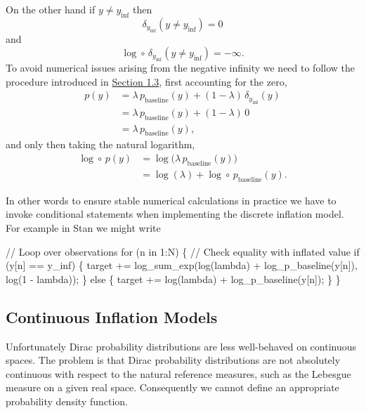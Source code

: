 \documentclass[
  letterpaper,
  DIV=11,
  numbers=noendperiod]{scrartcl}
\newenvironment{Shaded}{\begin{snugshade}}{\end{snugshade}}
\newcommand{\CommentTok}[1]{\textcolor[rgb]{0.37,0.37,0.37}{#1}}
\newcommand{\ControlFlowTok}[1]{\textcolor[rgb]{0.00,0.23,0.31}{#1}}
\newcommand{\DecValTok}[1]{\textcolor[rgb]{0.68,0.00,0.00}{#1}}
\newcommand{\KeywordTok}[1]{\textcolor[rgb]{0.00,0.23,0.31}{#1}}
\newcommand{\NormalTok}[1]{\textcolor[rgb]{0.00,0.23,0.31}{#1}}
\begin{document}
On the other hand if \(y \ne y_{\mathrm{inf}}\) then \[
\delta_{y_{\mathrm{inf}}}(y \ne y_{\mathrm{inf}}) = 0
\] and \[
\log \circ \, \delta_{y_{\mathrm{inf}}}(y \ne y_{\mathrm{inf}}) = -\infty.
\] To avoid numerical issues arising from the negative infinity we need
to follow the procedure introduced in \hyperref[sec:stable_impl]{Section
1.3}, first accounting for the zero, \begin{align*}
p(y)
&=
  \lambda \, p_{\mathrm{baseline}}(y)
+ (1 - \lambda) \, \delta_{y_{\mathrm{inf}}}(y)
\\
&=
\lambda \, p_{\mathrm{baseline}}(y) + (1 - \lambda) \, 0
\\
&=
\lambda \, p_{\mathrm{baseline}}(y),
\end{align*} and only then taking the natural logarithm, \begin{align*}
\log \circ \, p(y)
&=
\log \big( \lambda \, p_{\mathrm{baseline}}(y) \big)
\\
&=
\log (\lambda) + \log \circ \, p_{\mathrm{baseline}}(y).
\end{align*}

In other words to ensure stable numerical calculations in practice we
have to invoke conditional statements when implementing the discrete
inflation model. For example in Stan we might write

\begin{Shaded}
\begin{Highlighting}[]
\CommentTok{// Loop over observations}
\ControlFlowTok{for}\NormalTok{ (n }\ControlFlowTok{in} \DecValTok{1}\NormalTok{:N) \{}
  \CommentTok{// Check equality with inflated value}
  \ControlFlowTok{if}\NormalTok{ (y[n] == y\_inf) \{}
    \KeywordTok{target +=}\NormalTok{ log\_sum\_exp(log(lambda) + log\_p\_baseline(y[n]),}
\NormalTok{                          log(}\DecValTok{1}\NormalTok{ {-} lambda));}
\NormalTok{  \} }\ControlFlowTok{else}\NormalTok{ \{}
    \KeywordTok{target +=}\NormalTok{ log(lambda) + log\_p\_baseline(y[n]);}
\NormalTok{  \}}
\NormalTok{\}}
\end{Highlighting}
\end{Shaded}

\subsection{Continuous Inflation Models}\label{sec:cont_infl}

Unfortunately Dirac probability distributions are less well-behaved on
continuous spaces. The problem is that Dirac probability distributions
are not absolutely continuous with respect to the natural reference
measures, such as the Lebesgue measure on a given real space.
Consequently we cannot define an appropriate probability density
function.
\end{document}
